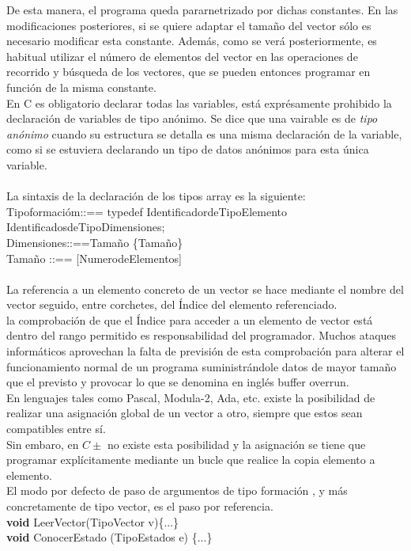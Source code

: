 \documentclass[11pt,a4paper]{article}
\begin{document}
  De esta manera, el programa queda pararnetrizado por dichas constantes. En
  las modificaciones posteriores, si se quiere adaptar el tamaño del vector sólo es necesario modificar esta constante. Además, como se verá posteriormente, es habitual utilizar el número de elementos del vector en las operaciones de recorrido y búsqueda de los vectores, que se pueden entonces programar en
  función de la misma constante.
  \\
  En C es obligatorio declarar todas las variables, está exprésamente prohibido la declaración de variables de tipo anónimo. Se dice que una vairable es de \textit{tipo anónimo} cuando su estructura se detalla es una misma declaración de la variable, como si se estuviera declarando un tipo de datos anónimos para esta única variable.\\
  \\
  La sintaxis de la declaración de los tipos array es la siguiente:
  Tipoformacióm::== typedef IdentificadordeTipoElemento IdentificadosdeTipoDimensiones;\\
  Dimensiones::==Tamaño \{Tamaño\}\\
  Tamaño ::== [NumerodeElementos]\\
  \\
  La referencia a un elemento concreto de un vector se hace mediante el nombre del vector seguido, entre corchetes,
  del Índice del elemento referenciado.\\
  la comprobación de que el Índice para acceder a un elemento de vector está
  dentro del rango permitido es responsabilidad del programador. Muchos ataques informáticos aprovechan la falta de previsión de esta comprobación para alterar el funcionamiento normal de un programa suministrándole datos de mayor tamaño que el previsto y provocar lo que se denomina en inglés buffer overrun.\\
  En lenguajes tales como Pascal, Modula-2, Ada, etc. existe la posibilidad de realizar una asignación global de un vector a otro, siempre que estos sean compatibles	entre sí.\\
  Sin embaro, en $C\pm$ no existe esta posibilidad y la asignación se tiene que
  programar explícitamente mediante un bucle que realice la copia elemento a elemento.\\
  El modo por defecto de paso de argumentos de tipo formación , y
  más concretamente de tipo vector, es el paso por referencia.\\
  \textbf{void} LeerVector(TipoVector v)\{...\}\\
  \textbf{void} ConocerEstado (TipoEstados e) \{...\}\\
  
\end{document}
